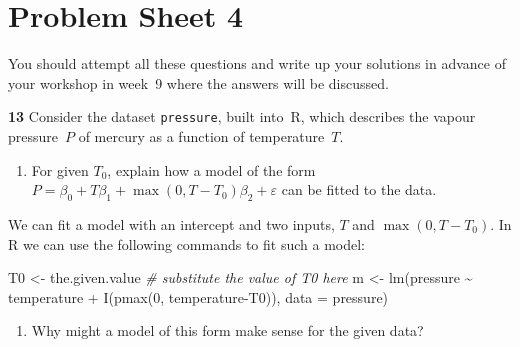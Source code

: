 \documentclass[
  a4paper,
]{article}
\newenvironment{Shaded}{\begin{snugshade}}{\end{snugshade}}
\newcommand{\AttributeTok}[1]{\textcolor[rgb]{0.77,0.63,0.00}{#1}}
\newcommand{\CommentTok}[1]{\textcolor[rgb]{0.56,0.35,0.01}{\textit{#1}}}
\newcommand{\DecValTok}[1]{\textcolor[rgb]{0.00,0.00,0.81}{#1}}
\newcommand{\FunctionTok}[1]{\textcolor[rgb]{0.00,0.00,0.00}{#1}}
\newcommand{\NormalTok}[1]{#1}
\newcommand{\OtherTok}[1]{\textcolor[rgb]{0.56,0.35,0.01}{#1}}
\newcommand{\SpecialCharTok}[1]{\textcolor[rgb]{0.00,0.00,0.00}{#1}}
\providecommand{\tightlist}{%
  \setlength{\itemsep}{0pt}\setlength{\parskip}{0pt}}
\theoremstyle{definition}
\theoremstyle{definition}
\theoremstyle{definition}
\theoremstyle{definition}
\theoremstyle{remark}
\begin{document}
\clearpage

\hypertarget{P04}{%
\section*{Problem Sheet 4}\label{P04}}


You should attempt all these questions and write up your solutions in advance
of your workshop in week~9 where the answers will be discussed.

\textbf{13} Consider the dataset \texttt{pressure}, built into~R, which
describes the vapour pressure~\(P\) of mercury as a function of
temperature~\(T\).

\begin{enumerate}
\def\labelenumi{\alph{enumi}.}
\tightlist
\item
  For given \(T_0\), explain how a model of the form
  \(P = \beta_0 + T \beta_1 + \max(0, T-T_0) \beta_2 + \varepsilon\) can be
  fitted to the data.
\end{enumerate}

\begin{myanswers}

We can fit a model with an intercept and two inputs,
\(T\) and \(\max(0, T-T_0)\). In R we can use the following
commands to fit such a model:

\begin{Shaded}
\begin{Highlighting}[]
\NormalTok{T0 }\OtherTok{\textless{}{-}}\NormalTok{ the.given.value }\CommentTok{\# substitute the value of T0 here}
\NormalTok{m }\OtherTok{\textless{}{-}} \FunctionTok{lm}\NormalTok{(pressure }\SpecialCharTok{\textasciitilde{}}\NormalTok{ temperature }\SpecialCharTok{+} \FunctionTok{I}\NormalTok{(}\FunctionTok{pmax}\NormalTok{(}\DecValTok{0}\NormalTok{, temperature}\SpecialCharTok{{-}}\NormalTok{T0)),}
        \AttributeTok{data =}\NormalTok{ pressure)}
\end{Highlighting}
\end{Shaded}

\end{myanswers}

\begin{enumerate}
\def\labelenumi{\alph{enumi}.}
\setcounter{enumi}{1}
\tightlist
\item
  Why might a model of this form make sense for the given data?
\end{enumerate}
\end{document}

